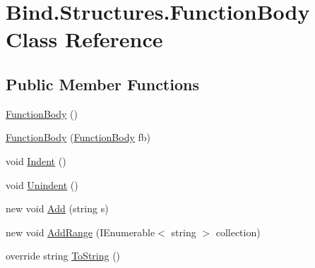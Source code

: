 \hypertarget{class_bind_1_1_structures_1_1_function_body}{
\section{Bind.Structures.FunctionBody Class Reference}
\label{class_bind_1_1_structures_1_1_function_body}
}
\subsection*{Public Member Functions}
\begin{DoxyCompactItemize}
\item 
\hyperlink{class_bind_1_1_structures_1_1_function_body_a889b671c8a789226100b1705a0b39d64}{FunctionBody} ()
\item 
\hyperlink{class_bind_1_1_structures_1_1_function_body_ad1c1a67986b843857f6a63b139500ec1}{FunctionBody} (\hyperlink{class_bind_1_1_structures_1_1_function_body}{FunctionBody} fb)
\item 
void \hyperlink{class_bind_1_1_structures_1_1_function_body_ad1d845b79f8605920e140bd19a52742f}{Indent} ()
\item 
void \hyperlink{class_bind_1_1_structures_1_1_function_body_aee88fc205d952ab61e0f9a426ab9763e}{Unindent} ()
\item 
new void \hyperlink{class_bind_1_1_structures_1_1_function_body_a62dcc782d4c72a28fa9b009919db1062}{Add} (string s)
\item 
new void \hyperlink{class_bind_1_1_structures_1_1_function_body_a6637f29e3e8f7ad428387da992f536da}{AddRange} (IEnumerable$<$ string $>$ collection)
\item 
override string \hyperlink{class_bind_1_1_structures_1_1_function_body_aa8b1f5157e4950b6e5e7c155aca56f01}{ToString} ()
\end{DoxyCompactItemize}


